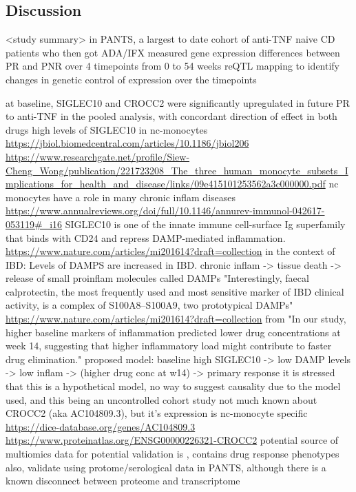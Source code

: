\begin{outline}
\section{Discussion}

\1 <study summary>
    \2 in PANTS, a largest to date cohort of anti-TNF naive CD patients who then got ADA/IFX
    \2 measured gene expression differences between PR and PNR over 4 timepoints from 0 to 54 weeks
    \2 reQTL mapping to identify changes in genetic control of expression over the timepoints

\1 at baseline, SIGLEC10 and CROCC2 were significantly upregulated in future PR to anti-TNF in the pooled analysis, with concordant direction of effect in both drugs
    \2 high levels of SIGLEC10 in nc-monocytes \url{https://jbiol.biomedcentral.com/articles/10.1186/jbiol206} \url{https://www.researchgate.net/profile/Siew-Cheng_Wong/publication/221723208_The_three_human_monocyte_subsets_Implications_for_health_and_disease/links/09e415101253562a3c000000.pdf}
        \3 nc monocytes have a role in many chronic inflam diseases \url{https://www.annualreviews.org/doi/full/10.1146/annurev-immunol-042617-053119#_i16}
    \2 SIGLEC10 is one of the innate immune cell-surface Ig superfamily that binds with CD24 and repress DAMP-mediated inflammation. \url{https://www.nature.com/articles/mi201614?draft=collection}
    \2 in the context of IBD: Levels of DAMPS are increased in IBD. 
        \3 chronic inflam -> tissue death -> release of small proinflam molecules called DAMPs \autocite{desouza2016ImmunopathogenesisIBDCurrent}
        \3 "Interestingly, faecal calprotectin, the most frequently used and most sensitive marker of IBD clinical activity, is a complex of S100A8–S100A9, two prototypical DAMPs" \url{https://www.nature.com/articles/mi201614?draft=collection} \autocite{desouza2016ImmunopathogenesisIBDCurrent}
        \2 from \autocite{kennedy2019PredictorsAntiTNFTreatment} "In our study, higher baseline markers of inflammation predicted lower drug concentrations at week 14, suggesting that higher inflammatory load might contribute to faster drug elimination."
        \2 proposed model: baseline high SIGLEC10 -> low DAMP levels -> low inflam -> (higher drug conc at w14) -> primary response
            \3 it is stressed that this is a hypothetical model, no way to suggest causality due to the model used, and this being an uncontrolled cohort study
\1 not much known about CROCC2 (aka AC104809.3), but it's expression is nc-monocyte specific \url{https://dice-database.org/genes/AC104809.3} \url{https://www.proteinatlas.org/ENSG00000226321-CROCC2}
    \2 potential source of multiomics data for potential validation is \autocite{imhann20191000IBDProjectMultiomics}, contains drug response phenotypes
    \2 also, validate using protome/serological data in PANTS, although there is a known disconnect between proteome and transcriptome


\end{outline}
